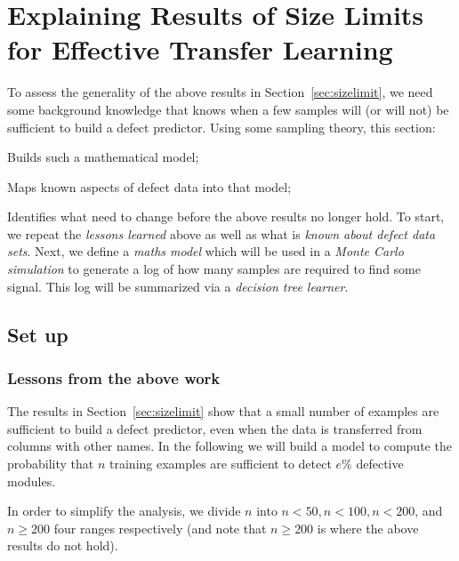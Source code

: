 

%

\newcommand{\tion}[1]{Section~\ref{sect:#1}}
\newcommand{\eq}[1]{Equation~\ref{eq:#1}}

\section{Explaining Results of Size Limits for Effective Transfer Learning}\label{sect:xplain}
To assess the generality of the above results in Section~\ref{sec:sizelimit}, we need some background knowledge that knows when a few samples will (or will not)
be sufficient to build a defect predictor. Using some sampling theory, this section:
\squishlist
\item
Builds such a mathematical model;
\item Maps known aspects
of defect data  into that model;
\item Identifies what need to change before the above results no longer hold.
\squishend
To start, we repeat the {\em lessons learned} above as well as what is {\em known about defect data sets}.
Next, we define a {\em maths model} which will be used in a {\em Monte Carlo simulation} to generate a log of how many samples are required
to find some signal. This log will be summarized via a {\em decision tree learner}.

\subsection{Set up}
\subsubsection{ Lessons from the above work}

The results in Section~\ref{sec:sizelimit} show
that a small number
of examples are sufficient to build a defect predictor, even when the data is  transferred from columns with other names.
In the following we will build a model to compute the probability that $n$ training examples are sufficient to detect $e$\% defective modules.

In order to simplify the analysis, we divide $n$ into
  $n<50, n<100, n<200$, and $n\ge 200$ four ranges respectively (and note that $n  \ge 200$ is where the above
  results do not hold).

